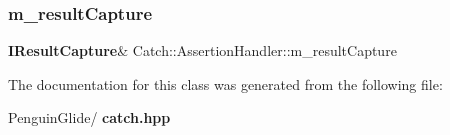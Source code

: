 \mbox{\label{class_catch_1_1_assertion_handler_aea5283ee36124ce5c51dc2a697b22a39}} 
\subsubsection{m\_resultCapture}
{\footnotesize\ttfamily \textbf{ I\+Result\+Capture}\& Catch\+::\+Assertion\+Handler\+::m\+\_\+result\+Capture\hspace{0.3cm}{\ttfamily [private]}}



The documentation for this class was generated from the following file\+:\begin{DoxyCompactItemize}
\item 
Penguin\+Glide/\textbf{ catch.\+hpp}\end{DoxyCompactItemize}
